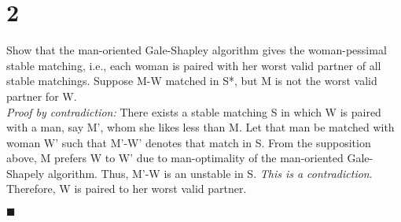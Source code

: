 \section*{2}
Show that the man-oriented Gale-Shapley algorithm gives the woman-pessimal stable matching, i.e., each woman is paired with her worst valid partner of all stable matchings.
\probLine
Suppose M-W matched in S*, but M is not the worst valid partner for W.\\ 
\textit{Proof by contradiction:} There exists a stable matching S in which W is paired with a man, say M', whom she likes less than M. Let that man be matched with woman W' such that M'-W' denotes that match in S. From the supposition above, M prefers W to W' due to man-optimality of the man-oriented Gale-Shapely algorithm. Thus, M'-W is an unstable in S. \textit{This is a contradiction}. Therefore, W is paired to her worst valid partner.
\begin{flushright}$\blacksquare$\end{flushright}